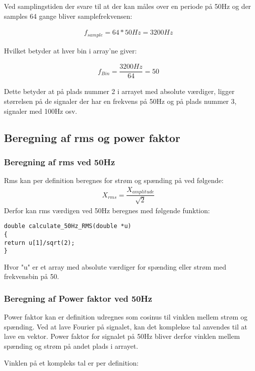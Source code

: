 Ved samplingstiden der svare til at der kan måles over en periode på 50Hz og der samples 64 gange bliver samplefrekvensen:

\begin{align}
f_{sample} = 64 * 50Hz = 3200Hz
\end{align}   

Hvilket betyder at hver bin i array'ne giver:

\begin{align}
f_{Bin} = \dfrac{3200Hz}{64} = 50
\end{align}

Dette betyder at på plads nummer 2 i arrayet med absolute værdiger, ligger størrelsen på de signaler der har en frekvens på 50Hz og på plads nummer 3, signaler med 100Hz osv.

\subsection{Beregning af rms og power faktor}

\subsubsection{Beregning af rms ved 50Hz}
Rms kan per definition beregnes for strøm og spænding på ved følgende: 
\begin{align}
 X_{rms}= \dfrac{X_{amplitude}}{\sqrt{2}}
\end{align}
Derfor kan rms værdigen ved 50Hz beregnes med følgende funktion:
\begin{lstlisting}
double calculate_50Hz_RMS(double *u)
{
return u[1]/sqrt(2);  
}
\end{lstlisting}

Hvor "u" er et array med absolute værdiger for spænding eller strøm med frekvensbin på 50.

\subsubsection{Beregning af Power faktor ved 50Hz}

Power faktor kan er definition udregnes som cosinus til vinklen mellem strøm og spænding. Ved at lave Fourier på signalet, kan det komplekse tal anvendes til at lave en vektor. Power faktor for signalet på 50Hz bliver derfor vinklen mellem spænding og strøm på andet plads i arrayet.

Vinklen på et kompleks tal er per definition:

